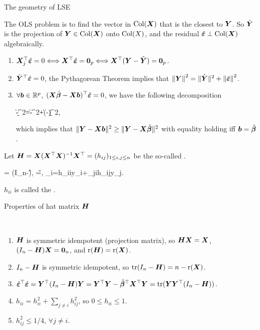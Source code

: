 \documentclass[10pt,a4paper]{book}
\begin{document}
\begin{thmbox}{The geometry of LSE}
	\begin{proposition}\label{prop:geo_LSE}
		The OLS problem is to find the vector in $\Col(\X)$ that is the closest to $\Y$.
		So $\hat{\Y}$ is the projection of $\Y\in\Col(\X)$ onto $\Col(X)$, and the residual $\hat{\bave}\perp\Col(\X)$ algebraically. 
		\begin{enumerate}
			\item $\X_j^\TT\hat{\bave}=0 \Longleftrightarrow \X^\TT\hat{\bave}=\0_p \Longleftrightarrow \X^\TT (\Y-\hat{\Y})=\0_p $.
			\item $\hat{\Y}^\TT\hat{\bave}=0$, the Pythagorean Theorem implies that $\norm{\Y}^2=\littlenorm{\hat{\Y}}^2+\norm{\hat{\bave}}^2$. 
			\item $\forall \b\in\bbR^{p}$, $(\X\hat{\bab}-\X\b)^\TT \hat{\bave}=0$, we have the following decomposition
			\begin{sequation*}
				\|\Y-\X\b\|^2=\|\Y-\X\hat{\bab}\|^2+\|\X(\hat{\bab}-\b)\|^2,
			\end{sequation*} 
			which implies that $\|\Y-\X\b\|^2\geq\|\Y-\X\hat{\bab}\|^2$ with equality holding iff $\b=\hat{\bab}$. 
		\end{enumerate}
		
	\end{proposition}
\end{thmbox}
Let $\H=\X(\X^\TT \X)^{-1}\X^\TT=(h_{ij})_{1\leq i,j\leq n}$ be the so-called .

\begin{salign*}
	\hat{\bave}= (I_n-\H)\Y, \qquad
	\hat{\Y}=\H\Y, \qquad {}_i=h_{ii}y_i+\sum_{j\neq i}h_{ij}y_j.
\end{salign*}
$h_{ii}$ is called the . 
 
\begin{thmbox}{Properties of hat matrix $\H$}
\begin{proposition}\label{prop:OLS_H}\
	\begin{enumerate}
		\item $\H$ is symmetric idempotent (projection matrix), so $\H\X=\X$, $(I_n-\H)\X=\0_n$, and $\rmr(\H)=\rmr(\X)$.   
		\item $I_n-\H$ is symmetric idempotent, so $\tr(I_n-\H)=n-\rmr(\X)$.
		\item $\hat{\bave}^\TT\hat{\bave}=\Y^\TT(I_n-\H)\Y=\Y^\TT\Y-\hat{\bab}^\TT \X^\TT \Y=\tr(\Y\Y^\TT(I_n-\H))$.  
		\item $h_{ii}=h_{ii}^2+\sum_{j\neq i}h_{ij}^2$, so $0\leq h_{ii}\leq 1$.  
		\item $h_{ij}^2\leq 1/4$, $\forall j\neq i$.  
	\end{enumerate}
\end{proposition}
\end{thmbox}
\end{document}
